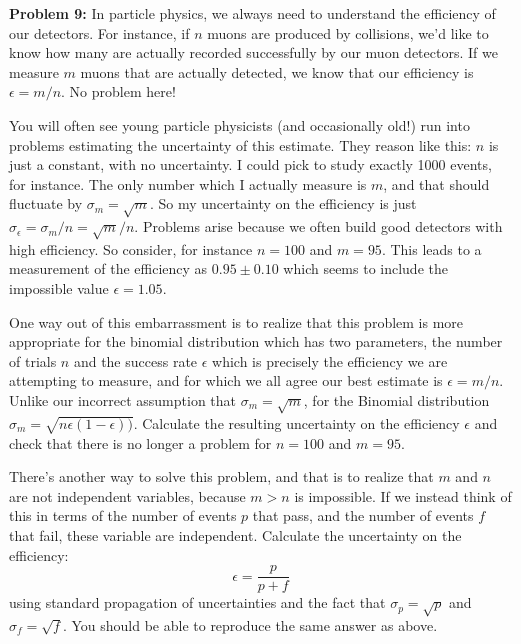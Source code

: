 \documentclass[12pt,oneside]{book}
\begin{document}
\noindent
{\bf Problem 9:}  In particle physics, we always need to understand the efficiency of our detectors.  For instance, if $n$ muons are produced by collisions, we'd like to know how many are actually recorded successfully by our muon detectors.  If we measure $m$ muons that are actually detected, we know that our efficiency is $\epsilon = m/n$.  No problem here!

You will often see young particle physicists (and occasionally old!) run into problems estimating the uncertainty of this estimate.  They reason like this:  $n$ is just a constant, with no uncertainty.  I could pick to study exactly 1000 events, for instance.  The only number which I actually measure is $m$, and that should fluctuate by $\sigma_m = \sqrt{m}$.  So my uncertainty on the efficiency is just $\sigma_\epsilon = \sigma_m/n = \sqrt{m}/n$.  Problems arise because we often build good detectors with high efficiency.  So consider, for instance $n=100$ and $m=95$.  This leads to a measurement of the efficiency as $0.95 \pm 0.10$ which seems to include the impossible value $\epsilon = 1.05$.

One way out of this embarrassment is to realize that this problem is more appropriate for the binomial distribution which has two parameters, the number of trials $n$ and the success rate $\epsilon$ which is precisely the efficiency we are attempting to measure, and for which we all agree our best estimate is $\epsilon = m/n$.  Unlike our incorrect assumption that $\sigma_m = \sqrt{m}$, for the Binomial distribution
$\sigma_m = \sqrt{n \epsilon (1 - \epsilon))}$.  Calculate the resulting uncertainty on the efficiency 
$\epsilon$ and check that there is no longer a problem for $n=100$ and $m=95$.

There's another way to solve this problem, and that is to realize that $m$ and $n$ are not independent variables, because $m > n$ is impossible.  If we instead think of this in terms of the number of events $p$ that pass, and the number of events $f$ that fail, these variable are independent.  Calculate the uncertainty on the efficiency: 
\begin{displaymath}
\epsilon = \frac{p}{p+f}
\end{displaymath}
using standard propagation of uncertainties and the fact that $\sigma_p = \sqrt{p}$ and $\sigma_f = \sqrt{f}$.  You should be able to reproduce the same answer as above. \\ \vskip 0.25cm
   
%
\end{document}

